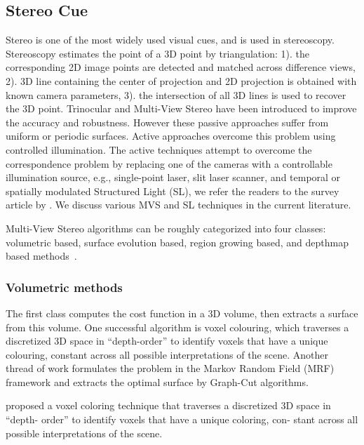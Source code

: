 \subsection{Stereo Cue}

Stereo is one of the most widely used visual cues, and is used in stereoscopy. Stereoscopy estimates the point of a 3D point by triangulation: 1). the corresponding 2D image points are detected and matched across difference views, 2). 3D line containing the center of projection and 2D projection is obtained with known camera parameters, 3). the intersection of all 3D lines is used to recover the 3D point. Trinocular and Multi-View Stereo have been introduced to improve the accuracy and robustness. However these passive approaches suffer from uniform or periodic surfaces. Active approaches overcome this problem using controlled illumination. The active techniques attempt to overcome the correspondence problem by replacing one of the cameras with a controllable illumination source, e.g., single-point laser, slit laser scanner, and temporal or spatially modulated Structured Light (SL), we refer the readers to the survey article by \citeauthor{blais2004review}. We discuss various MVS and SL techniques in the current literature.

Multi-View Stereo algorithms can be roughly categorized into four classes: volumetric based, surface evolution based, region growing based, and depthmap based methods~\cite{seitz2006comparison}.

\subsubsection{Volumetric methods}

The first class computes the cost function in a 3D volume, then extracts a surface from this volume. One successful algorithm is voxel colouring, which traverses a discretized 3D space in “depth-order” to identify voxels that have a unique colouring, constant across all possible interpretations of the scene. Another thread of work formulates the problem in the Markov Random Field (MRF) framework and extracts the optimal surface by Graph-Cut algorithms.

\citeauthor{seitz2006comparison} proposed a voxel coloring technique that traverses a discretized 3D space in “depth- order” to identify voxels that have a unique coloring, con- stant across all possible interpretations of the scene.



